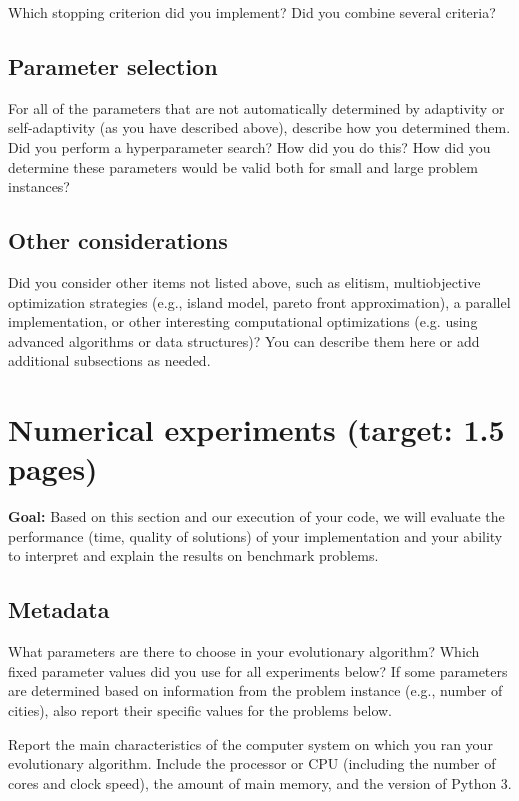 \documentclass[a4paper,10pt]{article}
\newcommand{\ReplaceMe}[1]{{\color{blue}#1}}
\newcommand{\RemoveMe}[1]{{\color{purple}#1}}
\begin{document}
\ReplaceMe{Which stopping criterion did you implement? Did you combine several criteria?}

\subsection{Parameter selection}

\ReplaceMe{For all of the parameters that are not automatically determined by adaptivity or self-adaptivity (as you have described above), describe how you determined them. Did you perform a hyperparameter search? How did you do this? How did you determine these parameters would be valid both for small and large problem instances?}

\subsection{Other considerations}


\ReplaceMe{Did you consider other items not listed above, such as elitism, multiobjective optimization strategies (e.g., island model, pareto front approximation), a parallel implementation, or other interesting computational optimizations (e.g. using advanced algorithms or data structures)? You can describe them here or add additional subsections as needed.}


\section{Numerical experiments (target: 1.5 pages)}

\RemoveMe{\textbf{Goal:} Based on this section and our execution of your code, we will evaluate the performance (time, quality of solutions) of your implementation and your ability to interpret and explain the results on benchmark problems.}

\subsection{Metadata}

\ReplaceMe{What parameters are there to choose in your evolutionary algorithm? Which fixed parameter values did you use for all experiments below? If some parameters are determined based on information from the problem instance (e.g., number of cities), also report their specific values for the problems below.

Report the main characteristics of the computer system on which you ran your evolutionary algorithm. Include the processor or CPU (including the number of cores and clock speed), the amount of main memory, and the version of Python 3.}
\end{document}
